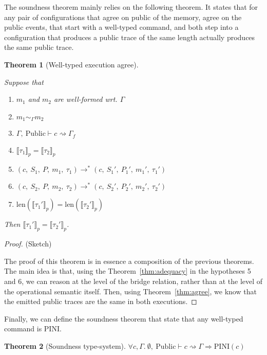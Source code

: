 \documentclass[10pt]{article}
\newcommand{\ctx}{\Gamma}
\newcommand{\typing}[4]{ #1,~#2 \vdash #3 \rightsquigarrow #4}
\newcommand{\exectrans}[2] { #1 \rightarrow^{*} #2 }
\newcommand{\pproj}[1]{\llbracket #1 \rrbracket_{p}}
\newcommand{\agree}[3]{#2 \sim_{#1} #3}
\newcommand{\pini}[1]{\mathrm{PINI}(#1)}
\newtheorem{theorem}{Theorem}
\begin{document}
The soundness theorem mainly relies on the following theorem. It states that for
any pair of configurations that agree on public of the memory, agree on the public events,
that start with a well-typed command, and both step into a configuration that produces a
public trace of the same length actually produces the same public trace.

\begin{theorem}[Well-typed execution agree]\label{thm:sound}

Suppose that

\begin{enumerate}
  \item $m_{1}$ and $m_{2}$ are well-formed wrt. $\ctx$
  \item $\agree{\ctx}{m_{1}}{m_{2}}$
  \item \( \typing{\ctx}{\mathrm{Public}}{c}{\ctx_{f}}\)
  \item $\pproj{\tau_{1}} = \pproj{\tau_{2}}$
  \item \(
        \exectrans
        {(c,~S_{1},~P,~m_{1},~\tau_{1})}
        {(c,~S_{1}',~P_{1}',~m_{1}',~\tau_{1}')}
        \)
  \item \(
        \exectrans
        {(c,~S_{2},~P,~m_{2},~\tau_{2})}
        {(c,~S_{2}',~P_{2}',~m_{2}',~\tau_{2}')}
        \)
  \item $\mathrm{len}(\pproj{\tau_{1}'}) = \mathrm{len}(\pproj{\tau_{2}'})$
\end{enumerate}

Then $\pproj{\tau_{1}'} = \pproj{\tau_{2}'}$.
\end{theorem}


\begin{proof} (Sketch)

  The proof of this theorem is in essence a composition of the previous theorems. The main idea is
  that, using the Theorem~\ref{thm:adequacy} in the hypotheses 5 and 6, we can reason at the level
  of the bridge relation, rather than at the level of the operational semantic itself.
  Then, using Theorem~\ref{thm:agree}, we know that the emitted public traces are the same in both
  executions.

\end{proof}

Finally, we can define the soundness theorem that state that any well-typed command is PINI.

\begin{theorem}[Soundness type-system]
  \( \forall c, \ctx.\
  \typing{\emptyset}{\mathrm{Public}}{c}{\ctx}
  \Rightarrow \pini{c}
  \)
\end{theorem}
\end{document}
